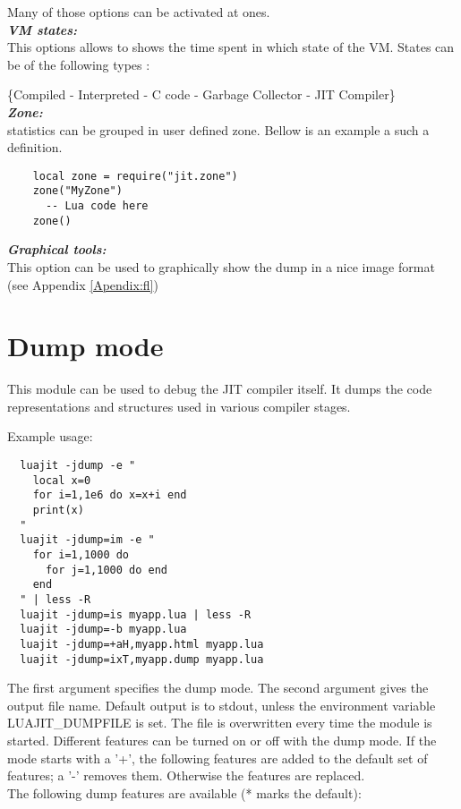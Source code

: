  Many of those options can be activated at ones.\\

\textbf{\emph{VM states:}}\\
This options allows to shows the time spent in which state of the VM.
States can be of the following types :

\{Compiled - Interpreted - C code - Garbage Collector - JIT Compiler\} \\

\textbf{\emph{Zone:}}\\
statistics can be grouped in user defined zone. Bellow is an example a such a
definition.
\begin{lstlisting}
    local zone = require("jit.zone")
    zone("MyZone")
      -- Lua code here
    zone()
\end{lstlisting}

\textbf{\emph{Graphical tools:}}\\
This option can be used to graphically show the dump in a nice image format
(see Appendix \ref{Apendix:fl})

\section{Dump mode}

This module can be used to debug the JIT compiler itself. It dumps the
code representations and structures used in various compiler stages.

Example usage:
\begin{lstlisting}
  luajit -jdump -e "
    local x=0
    for i=1,1e6 do x=x+i end
    print(x)
  "
  luajit -jdump=im -e "
    for i=1,1000 do
      for j=1,1000 do end
    end
  " | less -R
  luajit -jdump=is myapp.lua | less -R
  luajit -jdump=-b myapp.lua
  luajit -jdump=+aH,myapp.html myapp.lua
  luajit -jdump=ixT,myapp.dump myapp.lua
\end{lstlisting}
The first argument specifies the dump mode. The second argument gives
the output file name. Default output is to stdout, unless the environment
variable LUAJIT\_DUMPFILE is set. The file is overwritten every time the
module is started. Different features can be turned on or off with the dump mode.
If the mode starts with a '+', the following features are added to the default
set of features; a '-' removes them. Otherwise the features are replaced.\\
The following dump features are available (* marks the default):

